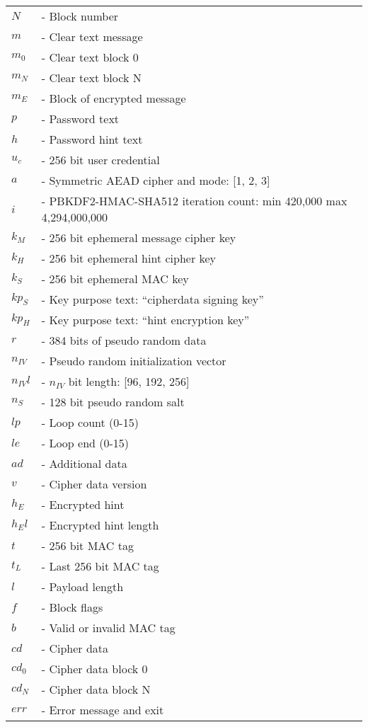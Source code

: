 \documentclass{article}
\begin{document}
\begin{tabular}{@{}p{2mm} l}
$N$ & \textrm{ - Block number}\\
$m$ & \textrm{ - Clear text message}\\
$m_0$ & \textrm{ - Clear text block 0}\\
$m_N$ & \textrm{ - Clear text block N}\\
$m_{E}$ & \textrm{ - Block of encrypted message}\\
$p$ & \textrm{ - Password text}\\
$h$ & \textrm{ - Password hint text}\\
$u_c$ & \textrm{ - 256 bit user credential}\\
$a$ & \textrm{ - Symmetric AEAD cipher and mode: [1, 2, 3]}\\
$i$ & \textrm{ - PBKDF2-HMAC-SHA512 iteration count: min 420,000 max 4,294,000,000}\\
$k_M$ & \textrm{ - 256 bit ephemeral message cipher key}\\
$k_H$ & \textrm{ - 256 bit ephemeral hint cipher key}\\
$k_S$ & \textrm{ - 256 bit ephemeral MAC key}\\
$kp_S$ & \textrm{ - Key purpose text: ``cipherdata signing key''}\\
$kp_H$ & \textrm{ - Key purpose text: ``hint encryption key''}\\
$r$ & \textrm{ - 384 bits of pseudo random data}\\
$n_{IV}$ & \textrm{ - Pseudo random initialization vector}\\
$n_{IV}l$ & \textrm{ - }$n_{IV}$\textrm{ bit length: [96, 192, 256]}\\
$n_S$ & \textrm{ - 128 bit pseudo random salt}\\
$lp$ & \textrm{ - Loop count (0-15)}\\
$le$ & \textrm{ - Loop end (0-15)}\\
$ad$ & \textrm{ - Additional data}\\
$v$ & \textrm{ - Cipher data version}\\
$h_E$ & \textrm{ - Encrypted hint}\\
$h_El$ & \textrm{ - Encrypted hint length}\\
$t$ & \textrm{ - 256 bit MAC tag}\\
$t_L$ & \textrm{ - Last 256 bit MAC tag}\\
$l$ & \textrm{ - Payload length}\\
$f$ & \textrm{ - Block flags}\\
$b$ & \textrm{ - Valid or invalid MAC tag}\\
$cd$ & \textrm{ - Cipher data}\\
$cd_0$ & \textrm{ - Cipher data block 0}\\
$cd_N$ & \textrm{ - Cipher data block N}\\
$err$ & \textrm{ - Error message and exit}\\
\end{tabular}
\end{document}
